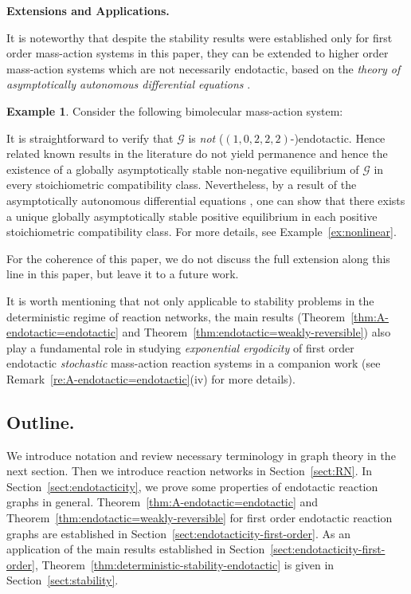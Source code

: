 \documentclass[10pt]{amsart}
\numberwithin{equation}{section}
\theoremstyle{plain}
\theoremstyle{definition}
\newtheorem{example}[theorem]{Example}
\theoremstyle{remark}
\newcommand{\cG}{\mathcal{G}}
\begin{document}
\noindent\textbf{Extensions and Applications.} {It is noteworthy that despite the stability  results were established only for first order mass-action systems in this paper, they can be extended to higher order mass-action systems which are not necessarily endotactic, based on the \emph{theory of asymptotically autonomous differential equations} \cite{T92}. 

\begin{example}
Consider the following bimolecular mass-action system:
\begin{center}
\end{center}
    It is straightforward to verify that $\mathcal{G}$ is \emph{not} ($(1,0,2,2,2)$-)endotactic. Hence related known results \cite{A11a,A11b,CNP13,GMS14} in the literature do not yield permanence and hence the existence of a globally asymptotically stable non-negative equilibrium of $\cG$ in every stoichiometric compatibility class. Nevertheless, by a result of the asymptotically autonomous differential equations \cite{T92}, one can show that there exists a unique globally asymptotically stable positive equilibrium in each positive stoichiometric compatibility class. For more details, see Example~\ref{ex:nonlinear}.
\end{example}

For the coherence of this paper, we do not discuss the full extension along this line in this paper, but leave it to a future work. 

It is worth mentioning that not only applicable to stability problems in the deterministic regime of reaction networks, the main results (Theorem~\ref{thm:A-endotactic=endotactic} and Theorem~\ref{thm:endotactic=weakly-reversible}) also play a fundamental role in studying  \emph{exponential ergodicity} of first order endotactic \emph{stochastic} mass-action reaction systems in a companion work (see Remark~\ref{re:A-endotactic=endotactic}(iv) for more details).}


\subsection*{Outline.}
We introduce notation and review necessary terminology in  graph theory in the next section. Then we introduce reaction networks in Section~\ref{sect:RN}. In Section~\ref{sect:endotacticity}, we prove some properties of endotactic reaction graphs in general. 
Theorem~\ref{thm:A-endotactic=endotactic} and Theorem~\ref{thm:endotactic=weakly-reversible} for first order endotactic reaction graphs are established  in Section~\ref{sect:endotacticity-first-order}. As an application of the main results established in Section~\ref{sect:endotacticity-first-order}, Theorem~\ref{thm:deterministic-stability-endotactic} is given in Section~\ref{sect:stability}. 
\endgroup
\end{document}
